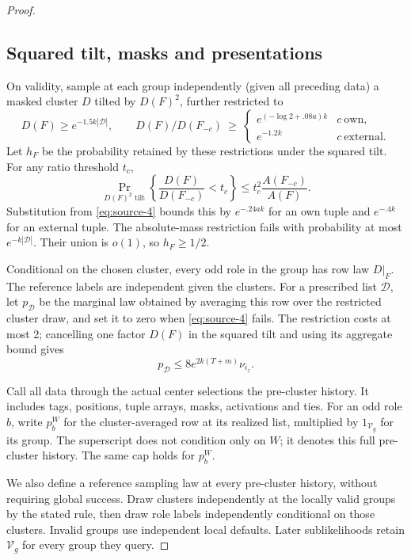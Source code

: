 \begin{proof}
\subsection{Squared tilt, masks and presentations}
\label{sec:squared-tilt-masks-and-presentations}

On validity, sample at each group independently (given all preceding data) a masked cluster \(D\) tilted by \(D(F)^2\), further restricted to
\[
 D(F)\ge e^{-1.5 k|\mathcal D|},\qquad
 D(F)/D(F_{-c})\ \ge\
 \begin{cases}e^{(-\log2+.08a)k}&c\ \text{own},\\ e^{-1.2k}&c\ \text{external}.\end{cases}
\]
Let \(h_F\) be the probability retained by these restrictions under the squared tilt. For any ratio threshold \(t_c\),
\[
 \Pr_{D(F)^2\text{ tilt}}\!\left\{\frac{D(F)}{D(F_{-c})}<t_c\right\}
 \le t_c^2\frac{A(F_{-c})}{A(F)}.
\]
Substitution from \eqref{eq:source-4} bounds this by \(e^{-.24ak}\) for an own tuple and \(e^{-.4k}\) for an external tuple. The absolute-mass restriction fails with probability at most \(e^{-k|\mathcal D|}\). Their union is \(o(1)\), so \(h_F\ge1/2\).

Conditional on the chosen cluster, every odd role in the group has row law \(D|_F\). The reference labels are independent given the clusters. For a prescribed list \(\mathcal D\), let \(p_{\mathcal D}\) be the marginal law obtained by averaging this row over the restricted cluster draw, and set it to zero when \eqref{eq:source-4} fails. The restriction costs at most 2; cancelling one factor \(D(F)\) in the squared tilt and using its aggregate bound gives
\[
 p_{\mathcal D}\le8e^{2k(T+m)}\nu_{i_z}.
\]

Call all data through the actual center selections the pre-cluster history. It includes tags, positions, tuple arrays, masks, activations and ties. For an odd role \(b\), write \(p_b^W\) for the cluster-averaged row at its realized list, multiplied by \(1_{\mathcal V_g}\) for its group. The superscript does not condition only on \(W\); it denotes this full pre-cluster history. The same cap holds for \(p_b^W\).

We also define a reference sampling law at every pre-cluster history, without requiring global success. Draw clusters independently at the locally valid groups by the stated rule, then draw role labels independently conditional on those clusters. Invalid groups use independent local defaults. Later sublikelihoods retain \(\mathcal V_g\) for every group they query.


\end{proof}
